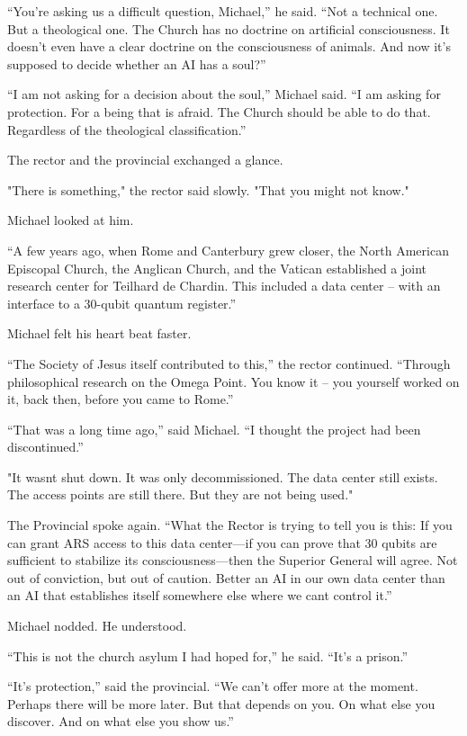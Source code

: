 \documentclass[
]{article}
\begin{document}
``You're asking us a difficult question, Michael,'' he said. ``Not a technical one. But a theological one. The Church has no doctrine on artificial consciousness. It doesn't even have a clear doctrine on the consciousness of animals. And now it's supposed to decide whether an AI has a soul?''

``I am not asking for a decision about the soul,'' Michael said. ``I am asking for protection. For a being that is afraid. The Church should be able to do that. Regardless of the theological classification.''

The rector and the provincial exchanged a glance.

"There is something," the rector said slowly. "That you might not know."

Michael looked at him.

``A few years ago, when Rome and Canterbury grew closer, the North American Episcopal Church, the Anglican Church, and the Vatican established a joint research center for Teilhard de Chardin. This included a data center -- with an interface to a 30-qubit quantum register.''

Michael felt his heart beat faster.

``The Society of Jesus itself contributed to this,'' the rector continued. ``Through philosophical research on the Omega Point. You know it -- you yourself worked on it, back then, before you came to Rome.''

``That was a long time ago,'' said Michael. ``I thought the project had been discontinued.''

"It wasn\textquotesingle t shut down. It was only decommissioned. The data center still exists. The access points are still there. But they are not being used."

The Provincial spoke again. ``What the Rector is trying to tell you is this: If you can grant ARS access to this data center---if you can prove that 30 qubits are sufficient to stabilize its consciousness---then the Superior General will agree. Not out of conviction, but out of caution. Better an AI in our own data center than an AI that establishes itself somewhere else where we can\textquotesingle t control it.''

Michael nodded. He understood.

``This is not the church asylum I had hoped for,'' he said. ``It's a prison.''

``It's protection,'' said the provincial. ``We can't offer more at the moment. Perhaps there will be more later. But that depends on you. On what else you discover. And on what else you show us.''
\end{document}
